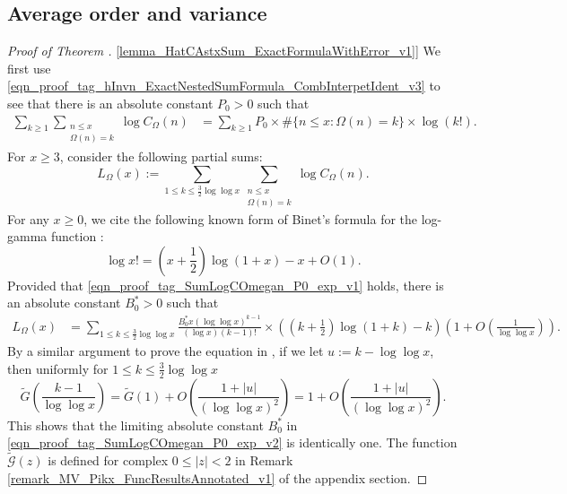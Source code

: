 \documentclass[11pt,reqno,a4letter]{article}
\newcommand{\hlocalref}[1]{\hyperref[#1]{\ref{#1}}}
\numberwithin{equation}{section}
\numberwithin{figure}{section}
\numberwithin{table}{section}
\theoremstyle{plain}
\numberwithin{theorem}{section}
\theoremstyle{definition}
\begin{document}
\subsection{Average order and variance}
\label{subSection_AvgOrdersOfTheUnsignedSequences} 

\begin{proof}[Proof of Theorem \hlocalref{lemma_HatCAstxSum_ExactFormulaWithError_v1}]  
We first use \eqref{eqn_proof_tag_hInvn_ExactNestedSumFormula_CombInterpetIdent_v3} to 
see that there is an absolute constant $P_0 > 0$ 
such that 
\begin{align}
\label{eqn_proof_tag_SumLogCOmegan_P0_exp_v1}
\sum_{k \geq 1} \sum_{\substack{n \leq x \\ \Omega(n)=k}} \log C_{\Omega}(n) & = 
     \sum_{k \geq 1} P_0 \times \#\{n \leq x: \Omega(n)=k\} \times \log(k!). 
\end{align}
For $x \geq 3$, consider the following partial sums:
\[
L_{\Omega}(x) := \sum_{1 \leq k \leq \frac{3}{2}\log\log x} 
	\sum_{\substack{n \leq x \\ \Omega(n)=k}} \log C_{\Omega}(n). 
\]
For any $x \geq 0$, we cite the following known form of 
Binet's formula for the log-gamma function \cite[\S 5.9(i)]{NISTHB}: 
\[
\log x! = \left(x+\frac{1}{2}\right)\log(1+x) - x + O(1). 
\]
Provided that \eqref{eqn_proof_tag_SumLogCOmegan_P0_exp_v1} holds, 
there is an absolute constant $B_0^{\ast} > 0$ such that 
\begin{align}
\label{eqn_proof_tag_SumLogCOmegan_P0_exp_v2}
L_{\Omega}(x) & = \sum_{1 \leq k \leq \frac{3}{2}\log\log x} 
	\frac{B_0^{\ast} x (\log\log x)^{k-1}}{(\log x) (k-1)!} \times \left(
	\left(k+\frac{1}{2}\right) \log(1+k) - k\right)\left(1 + 
	O\left(\frac{1}{\log\log x}\right)\right). 
\end{align}
By a similar argument to prove the equation in 
\cite[Thm.~7.21; \S 7.4]{MV}, if we let 
$u := k - \log\log x$, then uniformly for $1 \leq k \leq \frac{3}{2}\log\log x$ 
\[
\widetilde{G}\left(\frac{k-1}{\log\log x}\right) = 
	\widetilde{G}(1) + O\left(\frac{1 + |u|}{(\log\log x)^2}\right) = 
	1 + O\left(\frac{1 + |u|}{(\log\log x)^2}\right). 
\]
This shows that the limiting absolute constant $B_0^{\ast}$ in 
\eqref{eqn_proof_tag_SumLogCOmegan_P0_exp_v2} is identically one. 
The function $\widetilde{\mathcal{G}}(z)$ is defined for complex $0 \leq |z| < 2$ in 
Remark \hlocalref{remark_MV_Pikx_FuncResultsAnnotated_v1} of the appendix section. 


\end{proof}
\end{document}
